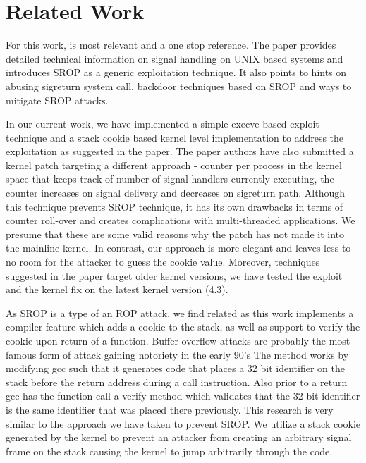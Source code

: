 \documentclass{sig-alternate-05-2015}
\begin{document}
\section{Related Work}
For this work, \cite{bosman2014framing} is most relevant and a one 
stop reference. The paper provides detailed technical information 
on signal handling on UNIX based systems and introduces SROP as a 
generic exploitation technique. It also points to hints on abusing 
sigreturn system call, backdoor techniques based on SROP and ways to 
mitigate SROP attacks. 

\par In our current work, we have implemented a simple execve based 
exploit technique and a stack cookie based kernel level implementation
to address the exploitation as suggested in the paper. The paper authors
have also submitted a kernel patch targeting a different approach - counter
per process in the kernel space that keeps track of number of signal handlers
currently executing, the counter increases on signal delivery and decreases
on sigreturn path. Although this technique prevents SROP technique, it has
its own drawbacks in terms of counter roll-over and creates complications with
multi-threaded applications. We presume that these are some valid reasons why
the patch has not made it into the mainline kernel. In contrast, our approach 
is more elegant and leaves less to no room for the attacker to guess the cookie
value. Moreover, techniques suggested in the paper target older kernel versions, 
we have tested the exploit and the kernel fix on the latest kernel version (4.3).

\par As SROP is a type of an ROP attack, we find \cite{cowan1998stackguard}
related as this work implements a compiler feature which adds a cookie to the stack, 
as well as support to verify the cookie upon return of a function.  Buffer overflow 
attacks are probably the most famous form of attack gaining notoriety in the early 90's
The method works by modifying gcc such that it generates code that places a
32 bit identifier on the stack before the return address during a call instruction.
Also prior to a return gcc has the function call a verify method which validates 
that the 32 bit identifier is the same identifier that was placed there previously.
This research is very similar to the approach we have taken to prevent SROP.  
We utilize a stack cookie generated by the kernel to prevent an attacker from 
creating an arbitrary signal frame on the stack causing the kernel to jump arbitrarily 
through the code.
\end{document}
